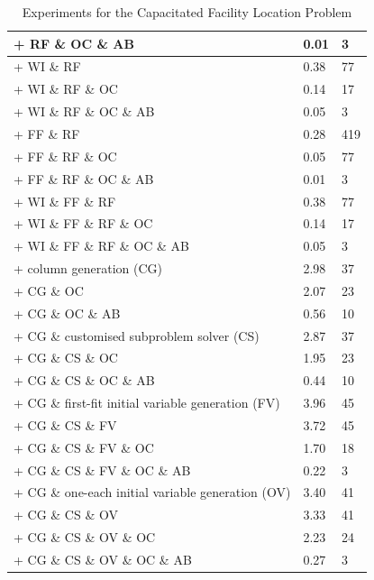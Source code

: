 \begin{table}[ht]
\begin{center}
\begin{tabular}[c]{|lll|}
+ RF \& OC \& AB                                   & 0.01 							& 3 \\
\hline
+ WI \& RF                                         & 0.38 							& 77 \\
+ WI \& RF \& OC                                   & 0.14 							& 17 \\
+ WI \& RF \& OC \& AB                             & 0.05 							& 3 \\
\hline
+ FF \& RF                                         & 0.28 							& 419 \\
+ FF \& RF \& OC                                   & 0.05 							& 77 \\
+ FF \& RF \& OC \& AB                             & 0.01 							& 3 \\
\hline
+ WI \& FF \& RF                                   & 0.38 							& 77 \\
+ WI \& FF \& RF \& OC                             & 0.14 							& 17 \\
+ WI \& FF \& RF \& OC \& AB                       & 0.05 							& 3 \\
\hline
+ column generation (CG)                           & 2.98 							& 37 \\
+ CG \& OC                                         & 2.07 							& 23 \\
+ CG \& OC \& AB                                   & 0.56								& 10 \\
\hline
+ CG \& customised subproblem solver (CS)          & 2.87 							& 37 \\
+ CG \& CS \& OC                                   & 1.95 							& 23 \\
+ CG \& CS \& OC \& AB                             & 0.44 							& 10 \\
\hline
+ CG \& first-fit initial variable generation (FV) & 3.96 							& 45 \\
+ CG \& CS \& FV                                   & 3.72 							& 45 \\
+ CG \& CS \& FV \& OC                             & 1.70 							& 18 \\
+ CG \& CS \& FV \& OC \& AB                       & 0.22 							& 3\\
\hline
+ CG \& one-each initial variable generation (OV)  & 3.40 							& 41 \\
+ CG \& CS \& OV                                   & 3.33 							& 41 \\
+ CG \& CS \& OV \& OC                             & 2.23 							& 24 \\
+ CG \& CS \& OV \& OC \& AB                       & 0.27 							& 3 \\
\hline
\end{tabular} 
\end{center}
\caption{Experiments for the Capacitated Facility Location Problem} \label{tab:fac_exp}
\end{table}

